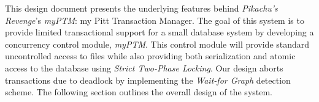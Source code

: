 This design document presents the underlying features behind \textit{Pikachu's Revenge}'s \textit{myPTM}: my Pitt Transaction Manager. The goal of this system is to provide limited transactional support for a small database system by developing a concurrency control module, \textit{myPTM}. This control module will provide standard uncontrolled access to files while also providing both serialization and atomic access to the database using \textit{Strict Two-Phase Locking}. Our design aborts transactions due to deadlock by implementing the \textit{Wait-for Graph} detection scheme. The following section outlines the overall design of the system.